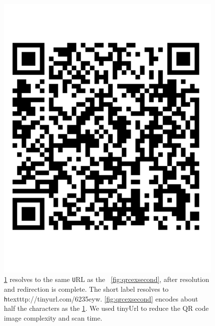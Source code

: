 

\begin{figure}[h!]
\begin{center}
\includegraphics[scale=0.148]{figs/qrcexlong}
\caption{\ref{fig:qrcexfirst} resolves to the same {\texttt URL} as the ~\ref{fig:qrcexsecond}, after resolution and
	redirection is complete. 
	The short label resolves to {\texttt htextttp://tinyurl.com/6235eyw}.  \ref{fig:qrcexsecond} encodes about half
	the characters as the \ref{fig:qrcexfirst}.
	We used tinyUrl to reduce the QR code image complexity and scan time.}
\label{fig:qrcexfirst}
\end{center}
\end{figure}


